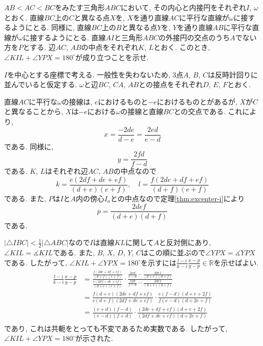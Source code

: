 \begin{bprb}[IMO2024-4]
$AB<AC<BC$をみたす三角形$ABC$において, その内心と内接円をそれぞれ$I$, $\omega$とおく.
直線$BC$上の$C$と異なる点$X$を, $X$を通り直線$AC$に平行な直線が$\omega$に接するようにとる.
同様に, 直線$BC$上の$B$と異なる点$Y$を, $Y$を通り直線$AB$に平行な直線が$\omega$に接するようにとる.
直線$AI$と三角形$ABC$の外接円の交点のうち$A$でない方を$P$とする.
辺$AC$, $AB$の中点をそれぞれ$K$, $L$とおく.
このとき, $\angle KIL+\angle YPX=180^\circ$が成り立つことを示せ.
\end{bprb}
\begin{ifsol*}
$I$を中心とする座標で考える.
一般性を失わないため, $3$点$A$, $B$, $C$は反時計回りに並んでいると仮定する.
$\omega$と辺$BC$, $CA$, $AB$との接点をそれぞれ$D$, $E$, $F$とおく.

直線$AC$に平行な$\omega$の接線は, $e$におけるものと$-e$におけるものとがあるが, $X$が$C$と異なることから, $X$は$-e$における$\omega$の接線と直線$BC$との交点である.
これにより,
\[x=\frac{-2de}{d-e}=\frac{2ed}{e-d}\]
である.
同様に,
\[y=\frac{2fd}{f-d}\]
である.
$K$, $L$はそれぞれ辺$AC$, $AB$の中点なので
\[k=\frac{e(2df+de+ef)}{(d+e)(e+f)},\quad l=\frac{f(2de+df+ef)}{(d+f)(e+f)}\]
である.
また, $P$は$I$と$A$内の傍心$I_a$との中点なので定理\ref{thm:excenter-i}により
\[p=\frac{2def}{(d+e)(d+f)}\]
である.

$\lvert\triangle{IBC}\rvert<\frac 12\lvert\triangle{ABC}\rvert$なので$I$は直線$KL$に関して$A$と反対側にあり, $\angle KIL=\measuredangle KIL$である.
また, $B$, $X$, $D$, $Y$, $C$はこの順に並ぶので$\angle YPX=\measuredangle YPX$である.
したがって, $\angle KIL+\angle YPX=180^\circ$を示すには$\frac{l-i}{k-i}\frac{x-p}{y-p}\in\mathbb{R}$を示せばよい.
\begin{align*}
\frac{l-i}{k-i}\frac{x-p}{y-p}
&=\frac{\frac{f(2de+df+ef)}{(d+f)(e+f)}}{\frac{e(2df+de+ef)}{(d+e)(e+f)}}\cdot\frac{\frac{2ed}{e-d}-\frac{2def}{(d+e)(d+f)}}{\frac{2fd}{f-d}-\frac{2def}{(d+e)(d+f)}}\\
&=\frac{f(d+e)(2de+df+ef)}{e(d+f)(2df+de+ef)}\cdot\frac{e(f-d)(d+e+2f)}{f(e-d)(d+2e+f)}\\
&=\frac{(e+d)(f-d)}{(e-d)(f+d)}\cdot\frac{(2de+df+ef)(d+e+2f)}{(2df+de+ef)(d+2e+f)}\\
\end{align*}
であり, これは共軛をとっても不変であるため実数である.
したがって, $\angle KIL+\angle YPX=180^\circ$が示された.
\end{ifsol*}